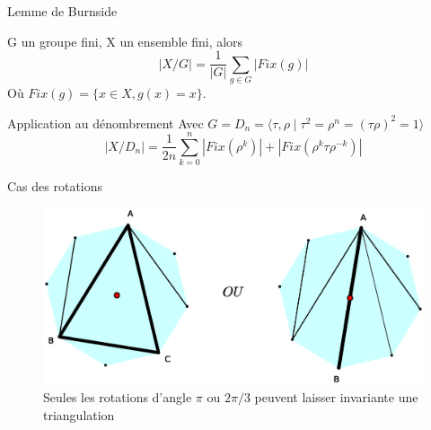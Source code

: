 \documentclass[french,xcolor=dvipsnames]{beamer}
\begin{document}
		\begin{frame}{Lemme de Burnside}
			\begin{theorem}
				G un groupe fini, X un ensemble fini, alors
				\[
				|X/G| = \frac{1}{|G|}\sum_{g\in G}{|Fix(g)|}
				\]
				Où $Fix(g) = \{x\in X, g(x) = x\}$.
			\end{theorem}
		\end{frame}
		
		\begin{frame}{Application au dénombrement}
			Avec $G=D_{n}=\langle\tau,\rho\mid \tau^{2}=\rho^{n}=(\tau\rho)^{2}=1\rangle$
			\[
				|X/D_{n}| = \frac{1}{2n}\sum_{k=0}^{n}|Fix(\rho^{k})|+|Fix(\rho^{k}\tau\rho^{-k})|
			\]
		\end{frame}
		\begin{frame}{Cas des rotations}
		\begin{figure}[1]
		\includegraphics[scale=0.45]{invariances_rotation.eps}
			\caption{Seules les rotations d'angle $\pi$ ou $2\pi/3$ peuvent laisser invariante une triangulation}
			\end{figure}
		\end{frame}
		
\end{document}

